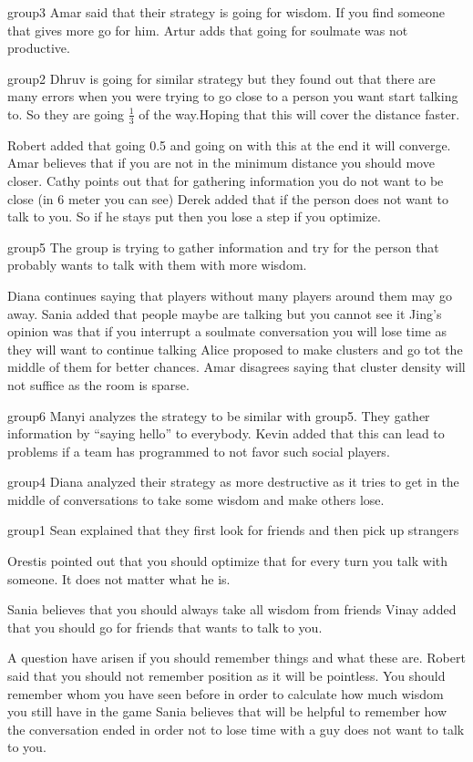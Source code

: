 group3
Amar said that their strategy is going for wisdom. If you find someone that gives more go for him.
Artur adds that going for soulmate was not productive.

group2
Dhruv is going for similar strategy but they found out that there are many errors when you were trying to go close to a person you want start talking to. So they are going $\frac{1}{3}$ of the way.Hoping that this will cover the distance faster.

Robert added that going 0.5 and going on with this at the end it will converge.
Amar believes that if you are not in the minimum distance you should move closer.
Cathy points out that for gathering information you do not want to be close (in 6 meter you can see)
Derek added that if the person does not want to talk to you. So if he stays put then you lose a step if you optimize.


group5
The group is trying to gather information and try for the person that probably wants to talk with them with more wisdom.

Diana continues saying that players without many players around them may go away.
Sania added that people maybe are talking but you cannot see it
Jing’s opinion was that if you interrupt a soulmate conversation you will lose time as they will want to continue talking
Alice proposed to make clusters and go tot the middle of them for better chances.
Amar disagrees saying that cluster density will not suffice as the room is sparse.
 
group6
Manyi analyzes the strategy to be similar with group5. They gather information by “saying hello” to everybody.
Kevin added that this can lead to problems if a team has programmed to not favor 
such social players.

group4
Diana analyzed their strategy as more destructive as it tries to get in the middle of conversations to take some wisdom and make others lose.

group1
Sean explained that they first look for friends and then pick up strangers

Orestis pointed out that you should optimize  that for every turn you talk with someone. It does not matter what he is.

Sania believes that you should always take all wisdom from friends
Vinay added that you should go for friends that wants to talk to you.

A question have arisen if you should remember things and what these are.
Robert said that you should not remember position as it will be pointless. You should remember whom you have seen before in order to calculate how much wisdom you still have in the game
Sania believes that will be helpful to remember how the conversation ended in order not to lose time with a guy does not want to talk to you.

